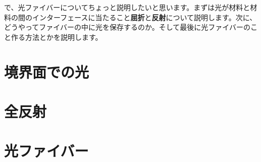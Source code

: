 で、光ファイバーについてちょっと説明したいと思います。まずは光が材料と材料の間のインターフェースに当たること\textbf{屈折}と\textbf{反射}について説明します。次に、どうやってファイバーの中に光を保存するのか。そして最後に光ファイバーのこと作る方法とかを説明します。


\section{境界面での光}
\section{全反射}
\section{光ファイバー}
